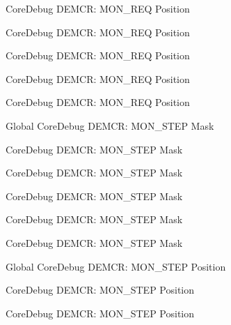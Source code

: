 \begin{DoxyRefList}
\label{deprecated__deprecated000409}%
%
Core\+Debug DEMCR\+: MON\+\_\+\+REQ Position 

\label{deprecated__deprecated000498}%
%
Core\+Debug DEMCR\+: MON\+\_\+\+REQ Position 

\label{deprecated__deprecated000333}%
%
Core\+Debug DEMCR\+: MON\+\_\+\+REQ Position 

\label{deprecated__deprecated000191}%
%
Core\+Debug DEMCR\+: MON\+\_\+\+REQ Position 

\label{deprecated__deprecated000600}%
%
Core\+Debug DEMCR\+: MON\+\_\+\+REQ Position  
\item[Global \doxylink{group___c_m_s_i_s___core_debug_ga2ded814556de96fc369de7ae9a7ceb98}{Core\+Debug\+\_\+\+DEMCR\+\_\+\+MON\+\_\+\+STEP\+\_\+\+Msk} ]\label{deprecated__deprecated000501}%
%
Core\+Debug DEMCR\+: MON\+\_\+\+STEP Mask 

\label{deprecated__deprecated000412}%
%
Core\+Debug DEMCR\+: MON\+\_\+\+STEP Mask 

\label{deprecated__deprecated000194}%
%
Core\+Debug DEMCR\+: MON\+\_\+\+STEP Mask 

\label{deprecated__deprecated000336}%
%
Core\+Debug DEMCR\+: MON\+\_\+\+STEP Mask 

\label{deprecated__deprecated000050}%
%
Core\+Debug DEMCR\+: MON\+\_\+\+STEP Mask 

\label{deprecated__deprecated000603}%
%
Core\+Debug DEMCR\+: MON\+\_\+\+STEP Mask  
\item[Global \doxylink{group___c_m_s_i_s___core_debug_ga9ae10710684e14a1a534e785ef390e1b}{Core\+Debug\+\_\+\+DEMCR\+\_\+\+MON\+\_\+\+STEP\+\_\+\+Pos} ]\label{deprecated__deprecated000500}%
%
Core\+Debug DEMCR\+: MON\+\_\+\+STEP Position 

\label{deprecated__deprecated000335}%
%
Core\+Debug DEMCR\+: MON\+\_\+\+STEP Position 

\label{deprecated__deprecated000193}%
%
Core\+Debug DEMCR\+: MON\+\_\+\+STEP Position 


\end{DoxyRefList}
